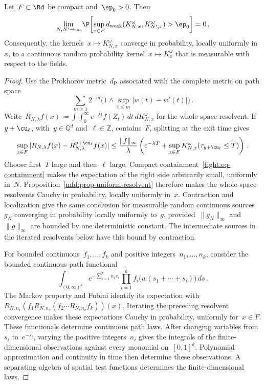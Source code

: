 \documentclass[11pt]{amsart}
\begin{document}
\begin{proposition}
\label{mfd:prop-quenched-convergence}
Let~$F\subset\Rd$ be compact and~$\ep_0>0$. Then
\begin{equation*}
	\lim_{N,N'\to\infty}\P\!\left[
	\sup_{x\in F}d_{\mathrm{weak}}(K^\omega_{N,x},K^\omega_{N',x})
	>\ep_0\right]=0\,.
\end{equation*}
Consequently, the kernels~$x\mapsto K^\omega_{N,x}$ converge in probability, locally uniformly in~$x$, to a continuous random probability kernel~$x\mapsto K^\omega_x$ that is measurable with respect to the fields.
\end{proposition}
\begin{proof}
Use the Prokhorov metric~$d_{\mathrm P}$ associated with the complete metric on path space
\begin{equation*}
	\sum_{m\geq1}2^{-m}
	\bigl(1\wedge\sup_{t\leq m}|w(t)-w'(t)|\bigr)\,.
\end{equation*}
Write~$R_{N,\lambda}f(x)\coloneqq\int\!\int_0^\infty e^{-\lambda t}f(Z_t)\,dt\,dK^\omega_{N,x}$ for the whole-space resolvent. If~$y+\cu_\ell$, with~$y\in\mathbb Q^d$ and~$\ell\in\mathbb Z$, contains~$F$, splitting at the exit time gives
\begin{equation}
	\sup_{x\in F}|R_{N,\lambda}f(x)-R^{y+\cu_\ell}_{N,\lambda}f(x)|
	\leq\frac{\|f\|_\infty}{\lambda}
	\left(e^{-\lambda T}+\sup_{x\in F}K^\omega_{N,x}(\tau_{y+\cu_\ell}\leq T)\right)\,.
	\label{eq:mfd-path-localization}
\end{equation}
Choose first~$T$ large and then~$\ell$ large. Compact containment~\eqref{tight:eq-containment} makes the expectation of the right side arbitrarily small, uniformly in~$N$. Proposition~\ref{mfd:prop-uniform-resolvent} therefore makes the whole-space resolvents Cauchy in probability, locally uniformly in~$x$. Contraction and localization give the same conclusion for measurable random continuous sources~$g_N$ converging in probability locally uniformly to~$g$, provided~$\|g_N\|_\infty$ and~$\|g\|_\infty$ are bounded by one deterministic constant. The intermediate sources in the iterated resolvents below have this bound by contraction.

\smallskip

For bounded continuous~$f_1,\ldots,f_k$ and positive integers~$n_1,\ldots,n_k$, consider the bounded continuous path functional
\begin{equation*}
	\int_{(0,\infty)^k}e^{-\sum_{i=1}^k n_i s_i}
	\prod_{i=1}^k f_i\bigl(w(s_1+\cdots+s_i)\bigr)\,ds\,.
\end{equation*}
The Markov property and Fubini identify its expectation with~$R_{N,n_1}(f_1R_{N,n_2}(f_2\cdots R_{N,n_k}f_k))(x)$. Iterating the preceding resolvent convergence makes these expectations Cauchy in probability, uniformly for~$x\in F$. These functionals determine continuous path laws. After changing variables from~$s_i$ to~$e^{-s_i}$, varying the positive integers~$n_i$ gives the integrals of the finite-dimensional observations against every monomial on~$[0,1]^k$. Polynomial approximation and continuity in time then determine these observations. A separating algebra of spatial test functions determines the finite-dimensional laws.


\end{proof}
\end{document}
